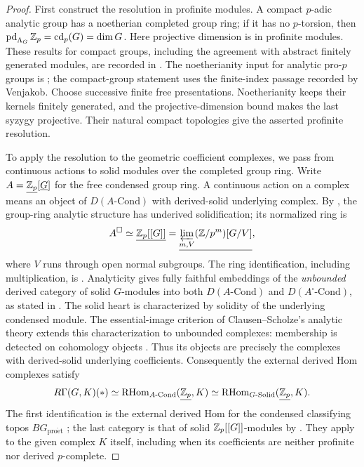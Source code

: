 \begin{proof}
First construct the resolution in profinite modules. A compact $p$-adic analytic group has a noetherian completed group
ring; if it has no $p$-torsion, then
$\operatorname{pd}_{\Lambda_G}\mathbb Z_p=\operatorname{cd}_p(G)=\dim G$.
Here projective dimension is in profinite modules.
These results for compact groups, including the agreement with
abstract finitely generated modules, are recorded in
\cite[\S\S1.1--1.2, pp.~275--276]{Venjakob2002}.
The noetherianity input for analytic pro-$p$ groups is
\cite[V.2.2.4]{Lazard1965}; the compact-group statement uses the
finite-index passage recorded by Venjakob.
Choose successive finite free presentations.  Noetherianity keeps
their kernels finitely generated, and the projective-dimension
bound makes the last syzygy projective.  Their natural compact
topologies give the asserted profinite resolution.

To apply the resolution to the geometric coefficient complexes, we
pass from continuous actions to solid modules over the completed group
ring. Write
$A=\underline{\mathbb Z_p}[\underline G]$ for the free condensed group
ring.  A continuous action on a complex means an object of
$D(A\text{-}\mathrm{Cond})$ with derived-solid underlying complex.
By \cite[Lemma~1.3]{Anschutz2020}, the group-ring analytic
structure has underived solidification; its normalized ring is
\[
 A^\square\simeq\underline{\mathbb Z_p[[G]]}
   =\underline{\varprojlim_{m,V}(\mathbb Z/p^m)[G/V]},
\]
where $V$ runs through open normal subgroups.  The ring
identification, including multiplication, is
\cite[\S3.6, preceding Proposition~3.21]{Tang2026}.
Analyticity gives fully faithful embeddings of the \emph{unbounded}
derived category
of solid $G$-modules into both $D(A\text{-}\mathrm{Cond})$ and
$D(A^\square\text{-}\mathrm{Cond})$, as stated in
\cite[\S1, pp.~3--4]{Anschutz2020}.
The solid heart is characterized by solidity of the underlying
condensed module. The essential-image criterion of Clausen--Scholze's
analytic theory extends this characterization to unbounded complexes:
membership is detected on cohomology objects
\cite[Proposition~12.4 and Remark~12.5]{ScholzeAnalyticGeometry}.
Thus its objects are precisely the complexes with derived-solid
underlying coefficients. Consequently the external derived Hom
complexes satisfy
\[
 R\Gamma(G,K)(*)
 \simeq\operatorname{RHom}_{A\text{-}\mathrm{Cond}}(\underline{\mathbb Z_p},K)
 \simeq\operatorname{RHom}_{G\text{-}\mathrm{Solid}}(\underline{\mathbb Z_p},K).
\]
The first identification is the external derived Hom for the condensed
classifying topos $BG_{\mathrm{pro\acute et}}$
\cite[\S2, pp.~5 and~8]{Anschutz2020}; the last category is that of
solid $\mathbb Z_p[[G]]$-modules by
\cite[Proposition~3.21]{Tang2026}.
They apply to the given complex $K$ itself, including when its
coefficients are neither profinite nor derived $p$-complete.


\end{proof}
